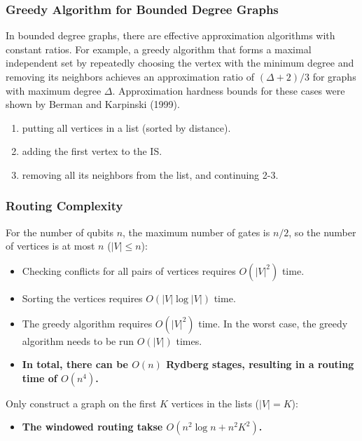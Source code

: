 \documentclass[18 pt]{beamer}
\begin{document}
\begin{frame}
    \frametitle{Greedy Algorithm for Bounded Degree Graphs}
    \begin{Theorem}
        In bounded degree graphs, there are effective approximation algorithms with constant ratios. For example, a greedy algorithm that forms a maximal independent set by repeatedly choosing the vertex with the minimum degree and removing its neighbors achieves an approximation ratio of $(\Delta + 2)/3$ for graphs with maximum degree $\Delta$. Approximation hardness bounds for these cases were shown by Berman and Karpinski (1999).
    \end{Theorem}
    \begin{enumerate}
        \item putting all vertices in a list (sorted by distance).
        \item adding the first vertex to the IS.
        \item removing all its neighbors from the list, and continuing 2-3.
    \end{enumerate}
\end{frame}
\begin{frame}
    \frametitle{Routing Complexity}
    For the number of qubits $n$, the maximum number of gates is $n/2$, so the number of vertices is at most $n$ ($|V| \leq n$):
    \begin{itemize}
        \item Checking conflicts for all pairs of vertices requires $O(|V|^2)$ time.
        \item Sorting the vertices requires $O(|V|\log |V|)$ time.
        \item The greedy algorithm requires $O(|V|^2)$ time. In the worst case, the greedy algorithm needs to be run $O(|V|)$ times.
        \item \textbf{In total, there can be $O(n)$ Rydberg stages, resulting in a routing time of $O(n^4)$.}
    \end{itemize}
    \vspace{10pt}
    Only construct a graph on the first $K$ vertices in the lists ($|V| = K$):
    \begin{itemize}
        \item \textbf{The windowed routing takse $O(n^2\log n + n^2K^2)$.}
    \end{itemize}
\end{frame}
\end{document}

